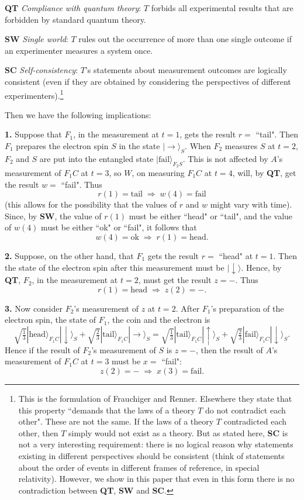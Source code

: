 \documentclass[12pt,a4paper,reqno]{article}
\newcommand{\head}{\text{head}}
\newcommand{\tail}{\text{tail}}
\newcommand{\ok}{\text{ok}}
\newcommand{\fail}{\text{fail}}
\newcommand{\be}{\begin{equation}}
\newcommand{\ee}{\end{equation}}
\renewcommand{\(}{\left(}
\renewcommand{\)}{\right)}
\renewcommand{\.}{\centerdot}
\newcommand{\1}{\mathbf{1}}
\newcommand{\<}{\langle}
\renewcommand{\>}{\rangle}
\newcommand{\third}{\tfrac{1}{3}}
\theoremstyle{definition}
\theoremstyle{remark}
\numberwithin{equation}{section}
\begin{document}
{\bf QT} \emph{Compliance with quantum theory}: $T$ forbids all experimental results that are forbidden by standard quantum theory.

{\bf SW} \emph{Single world}: $T$ rules out the occurrence of more than one single outcome if an experimenter measures a system once.

{\bf SC} \emph{Self-consistency}: $T$'s statements about measurement outcomes are logically consistent (even if they are obtained by considering the perspectives of different experimenters).\footnote{This is the formulation of Frauchiger and Renner. Elsewhere they state that this property ``demands that the laws of a theory $T$ do not contradict each other". These are not the same. If the laws of a theory $T$ contradicted each other, then $T$ simply would not exist as a theory. But as stated here, {\bf SC} is not a very interesting requirement: there is no logical reason why statements existing in different perspectives should be consistent (think of statements about the order of events in different frames of reference, in special relativity). However, we show in this paper that even in this form there is no contradiction between {\bf QT}, {\bf SW} and {\bf SC}.}

Then we have the following implications:

{\bf 1.} Suppose that $F_1$, in the measurement at $t = 1$, gets the result $r =$ ``tail". Then $F_1$ prepares the electron spin $S$ in the state $|\rightarrow\>_S$. When $F_2$ measures $S$ at $t = 2$, $F_2$ and $S$ are put into the entangled state $|\fail\>_{F_2S}$. This is not affected by $A$'s measurement of $F_1C$ at $t = 3$, so $W$, on measuring $F_1C$ at $t = 4$, will, by {\bf QT}, get the result $w =$ ``fail". Thus
\be\label{r implies w}
r(1) = \tail\; \Longrightarrow \; w(4) = \fail 
\ee
(this allows for the possibility that the values of $r$ and $w$ might vary with time). Since, by {\bf SW}, the value of $r(1)$ must be either ``head" or ``tail",  and the value of $w(4)$ must be either ``ok" or ``fail", it follows that 
\be\label{w implies r}
w(4) = \ok \; \Longrightarrow \; r(1) = \head.
\ee

{\bf 2.} Suppose, on the other hand, that $F_1$ gets the result $r =$ ``head" at $t = 1$. Then the state of the electron spin after this measurement must be $|\downarrow\>$. Hence, by {\bf QT}, $F_2$, in the measurement at $t = 2$, must get the result $z = -$. Thus
\be\label{r implies z}
r(1) = \head \; \Longrightarrow \; z(2) = -.
\ee

{\bf 3.} Now consider $F_2$'s measurement of $z$ at $t = 2$. After $F_1$'s preparation of the electron spin, the state of $F_1$, the coin and the electron is
\[
\sqrt{\third}|\head\>_{F_1C}|\downarrow\>_S + \sqrt{\tfrac{2}{3}}|\tail\>_{F_1C}|\rightarrow\>_S = \sqrt{\third}|\tail\>_{F_1C}|\uparrow\>_S + \sqrt{\tfrac{2}{3}}|\fail\>_{F_1C}|\downarrow\>_S.
\]
Hence if the result of $F_2$'s measurement of $S$ is $z = -$, then the result of $A$'s measurement of $F_1C$ at $t = 3$ must be $x =$ ``fail":
\be\label{z implies x}
z(2) = - \; \Longrightarrow \; x(3) = \fail.
\ee
\end{document}
